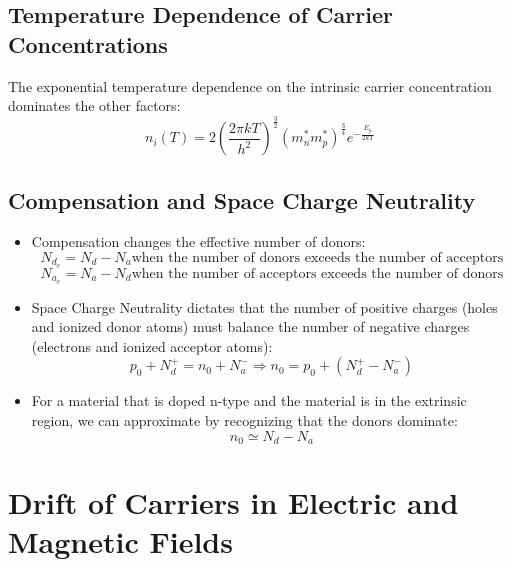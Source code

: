 \documentclass{article}
\begin{document}
\subsection{Temperature Dependence of Carrier Concentrations}
The exponential temperature dependence on the intrinsic carrier concentration dominates the other factors$:$
\begin{equation}n_i(T)=2(\frac{2\pi kT}{h^2})^{\frac{3}{2}} (m_n^*m_p^*)^{\frac{3}{4}}e^{-\frac{E_g}{2kT}} \end{equation}
\subsection{Compensation and Space Charge Neutrality}
\begin{itemize}
\item Compensation changes the effective number of donors$:$
  \begin{equation}N_{d_e}= N_d - N_a \text{when~the number of donors exceeds the number of acceptors}\end{equation}
  \begin{equation}N_{a_e}= N_a - N_d \text{when~the number of acceptors exceeds the number of donors}\end{equation}
\item Space Charge Neutrality dictates that the number of positive charges (holes and ionized donor atoms) must balance the number of negative charges (electrons and ionized acceptor atoms)$:$
  \begin{equation}p_0 + N_d^+ = n_0 + N_a^- \Rightarrow n_0 = p_0 + (N_d^+ - N_a^-)\end{equation}
\item For a material that is doped n-type and the material is in the extrinsic region, we can approximate by recognizing that the donors dominate$:$
\begin{equation} n_0 \simeq N_d - N_a\end{equation}
\end{itemize}

\section{Drift of Carriers in Electric and Magnetic Fields}
\end{document}
